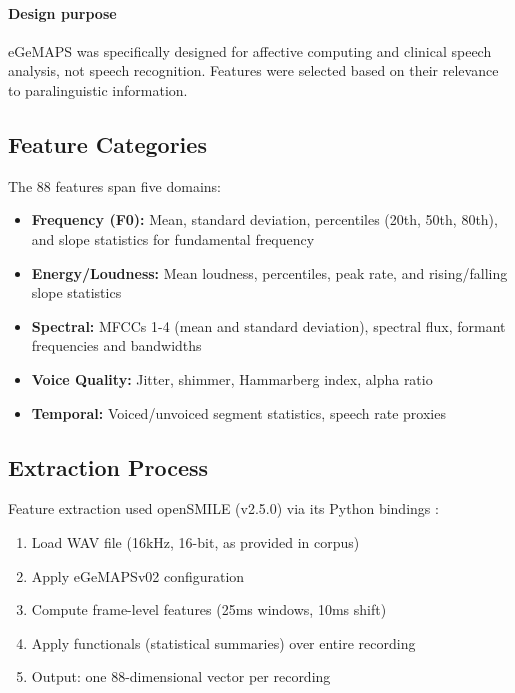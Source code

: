\paragraph{Design purpose} eGeMAPS was specifically designed for affective computing and clinical speech analysis, not speech recognition. Features were selected based on their relevance to paralinguistic information.

\subsection{Feature Categories}

The 88 features span five domains:

\begin{itemize}
    \item \textbf{Frequency (F0):} Mean, standard deviation, percentiles (20th, 50th, 80th), and slope statistics for fundamental frequency
    \item \textbf{Energy/Loudness:} Mean loudness, percentiles, peak rate, and rising/falling slope statistics
    \item \textbf{Spectral:} MFCCs 1-4 (mean and standard deviation), spectral flux, formant frequencies and bandwidths
    \item \textbf{Voice Quality:} Jitter, shimmer, Hammarberg index, alpha ratio
    \item \textbf{Temporal:} Voiced/unvoiced segment statistics, speech rate proxies
\end{itemize}

\subsection{Extraction Process}

Feature extraction used openSMILE (v2.5.0) via its Python bindings \cite{Eyben2010}:

\begin{enumerate}
    \item Load WAV file (16kHz, 16-bit, as provided in corpus)
    \item Apply eGeMAPSv02 configuration
    \item Compute frame-level features (25ms windows, 10ms shift)
    \item Apply functionals (statistical summaries) over entire recording
    \item Output: one 88-dimensional vector per recording
\end{enumerate}

